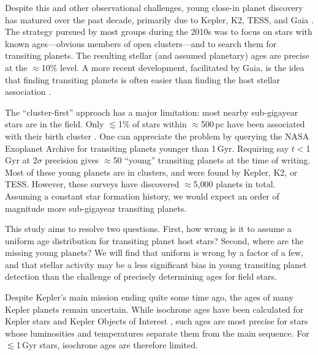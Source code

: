\documentclass[11pt,twocolumn,tighten]{aastex63}
\begin{document}
Despite this and other observational challenges, young close-in planet
discovery has matured over the past decade, primarily due to Kepler,
K2, TESS, and Gaia
\citep[e.g.][]{Meibom_2013,Mann_K2_25_2016,Curtis_2018,Livingston_2018,David_2019,Bouma_2020_toi837,Rizzuto_2020,Plavchan_2020,Newton_2021,Nardiello_2022,Barber_2022,Zhou_2022,Zakhozhay_2022,Wood_2023}.
The strategy pursued by most groups during the 2010s was to focus on
stars with known ages---obvious members of open clusters---and to
search them for transiting planets.  The resulting stellar (and
assumed planetary) ages are precise at the $\approx$10\% level.  A
more recent development, facilitated by Gaia, is the idea that finding
transiting planets is often easier than finding the host stellar
association \citep[e.g.][]{Tofflemire_2021}.

The ``cluster-first'' approach has a major limitation: most nearby
sub-gigayear stars are in the field.  Only $\lesssim$1\% of stars
within $\approx$500\,pc have been associated with their birth cluster
\citep[e.g.][]{Zari_2018,CantatGaudin_2020,Kounkel_2020,Kerr_2021}.
One can appreciate the problem by querying the NASA Exoplanet Archive
\citep[NEA;][]{2013PASP..125..989A} for transiting planets younger
than 1\,Gyr.  Requiring say $t$$<$1\,Gyr at
2$\sigma$ precision gives $\approx$50 ``young'' transiting planets at
the time of writing.  Most of these young planets are in clusters, and
were found by Kepler, K2, or TESS.  However, these surveys have
discovered $\approx$5{,}000 planets in total.  Assuming a constant
star formation history, we would expect an order of magnitude more
sub-gigayear transiting planets.

This study aims to resolve two questions.  First, how wrong is it
to assume a uniform age distribution for transiting planet host stars?
Second, where are the missing young planets?  We will find that
uniform is wrong by a factor of a few, and that stellar activity may
be a less significant bias in young transiting planet detection than
the challenge of precisely determining ages for field stars.

Despite Kepler's main mission ending quite some time ago, the ages of
many Kepler planets remain uncertain.  While isochrone ages have been
calculated for Kepler stars \citep{Berger_2020b_rpage} and Kepler
Objects of Interest \citep[KOIs;][]{Petigura_2022}, such ages are
most precise for stars whose luminosities and temperatures separate
them from the main sequence.  For $\lesssim$1\,Gyr stars, isochrone
ages are therefore limited.
\end{document}
